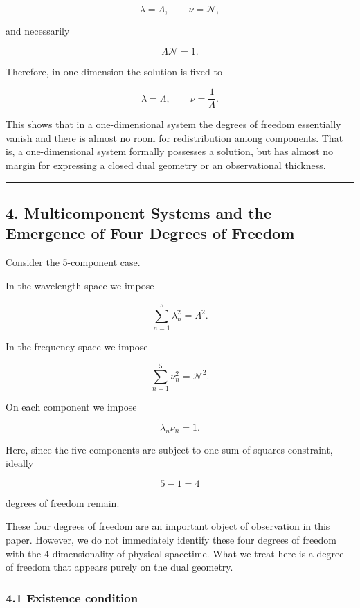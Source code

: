\documentclass[
]{article}
\begin{document}
\[
\lambda=\Lambda,\qquad
\nu=\mathcal{N} ,
\]

and necessarily

\[
\Lambda\mathcal{N}=1 .
\]

Therefore, in one dimension the solution is fixed to

\[
\lambda=\Lambda,\qquad
\nu=\frac{1}{\Lambda} .
\]

This shows that in a one-dimensional system the degrees of freedom
essentially vanish and there is almost no room for redistribution among
components. That is, a one-dimensional system formally possesses a
solution, but has almost no margin for expressing a closed dual geometry
or an observational thickness.

\begin{center}\rule{0.5\linewidth}{0.5pt}\end{center}

\subsection{4. Multicomponent Systems and the Emergence of Four Degrees
of
Freedom}\label{multicomponent-systems-and-the-emergence-of-four-degrees-of-freedom}

Consider the 5-component case.

In the wavelength space we impose

\[
\sum_{n=1}^{5} \lambda_n^2=\Lambda^2 .
\]

In the frequency space we impose

\[
\sum_{n=1}^{5} \nu_n^2=\mathcal{N}^2 .
\]

On each component we impose

\[
\lambda_n\nu_n=1 .
\]

Here, since the five components are subject to one sum-of-squares
constraint, ideally

\[
5-1=4
\]

degrees of freedom remain.

These four degrees of freedom are an important object of observation in
this paper. However, we do not immediately identify these four degrees
of freedom with the 4-dimensionality of physical spacetime. What we
treat here is a degree of freedom that appears purely on the dual
geometry.

\subsubsection{4.1 Existence condition}\label{existence-condition}
\end{document}
